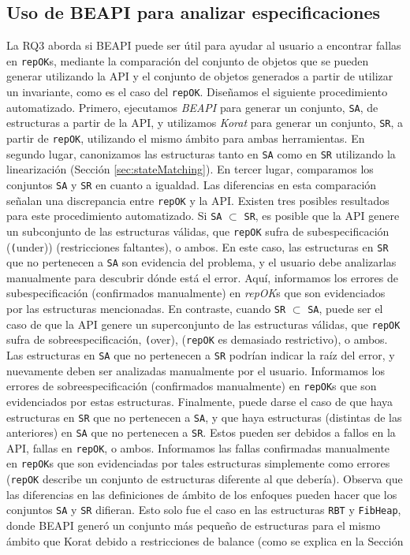 \subsection{Uso de BEAPI para analizar especificaciones}
\label{sec:existing-specs-analysis}

La RQ3 aborda si \textsf{BEAPI} puede ser útil para ayudar al usuario a encontrar fallas en \texttt{repOK}s, mediante la comparación del conjunto de objetos que se pueden generar utilizando la API y el conjunto de objetos generados a partir de utilizar un invariante, como es el caso del \texttt{repOK}. Diseñamos el siguiente procedimiento automatizado. Primero, ejecutamos \emph{BEAPI} para generar un conjunto, \texttt{SA}, de estructuras a partir de la API, y utilizamos \emph{Korat} para generar un conjunto, \texttt{SR}, a partir de \texttt{repOK}, utilizando el mismo ámbito para ambas herramientas. En segundo lugar, canonizamos las estructuras tanto en \texttt{SA} como en \texttt{SR} utilizando la linearización (Sección \ref{sec:stateMatching}). En tercer lugar, comparamos los conjuntos \texttt{SA} y \texttt{SR} en cuanto a igualdad. Las diferencias en esta comparación señalan una discrepancia entre \texttt{repOK} y la API. Existen tres posibles resultados para este procedimiento automatizado. Si \texttt{SA} $\subset$ \texttt{SR}, es posible que la API genere un subconjunto de las estructuras válidas, que \texttt{repOK} sufra de subespecificación (\texttt(under)) (restricciones faltantes), o ambos. En este caso, las estructuras en \texttt{SR} que no pertenecen a \texttt{SA} son evidencia del problema, y el usuario debe analizarlas manualmente para descubrir dónde está el error. Aquí, informamos los errores de subespecificación (confirmados manualmente) en \emph{repOK}s que son evidenciados por las estructuras mencionadas. En contraste, cuando \texttt{SR} $\subset$ \texttt{SA}, puede ser el caso de que la API genere un superconjunto de las estructuras válidas, que \texttt{repOK} sufra de sobreespecificación, \texttt(over), (\texttt{repOK} es demasiado restrictivo), o ambos. Las estructuras en \texttt{SA} que no pertenecen a \texttt{SR} podrían indicar la raíz del error, y nuevamente deben ser analizadas manualmente por el usuario. Informamos los errores de sobreespecificación (confirmados manualmente) en \texttt{repOK}s que son evidenciados por estas estructuras. Finalmente, puede darse el caso de que haya estructuras en \texttt{SR} que no pertenecen a \texttt{SA}, y que haya estructuras (distintas de las anteriores) en \texttt{SA} que no pertenecen a \texttt{SR}. Estos pueden ser debidos a fallos en la API, fallas en \texttt{repOK}, o ambos. Informamos las fallas confirmadas manualmente en \texttt{repOK}s que son evidenciadas por tales estructuras simplemente como errores (\texttt{repOK} describe un conjunto de estructuras diferente al que debería). Observa que las diferencias en las definiciones de ámbito de los enfoques pueden hacer que los conjuntos \texttt{SA} y \texttt{SR} difieran. Esto solo fue el caso en las estructuras \texttt{RBT} y \texttt{FibHeap}, donde \textsf{BEAPI} generó un conjunto más pequeño de estructuras para el mismo ámbito que \textsf{Korat} debido a restricciones de balance (como se explica en la Sección 
